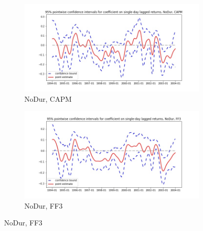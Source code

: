 \documentclass{article}
\begin{document}
      \begin{figure}
  \begin{subfigure}[b]{0.5\textwidth}
    \centering
    \includegraphics[width=\textwidth]{NoDur/pointwiseCIs_CAPM.jpg}
    \caption{NoDur, CAPM}
    \label{fig:1}
  \end{subfigure}
  \begin{subfigure}[b]{0.5\textwidth}
    \centering
    \includegraphics[width=\textwidth]{NoDur/pointwiseCIs_FF3.jpg}
    \caption{NoDur, FF3}
    \label{fig:2}
  \end{subfigure}
  \end{figure}
    
\end{document}
